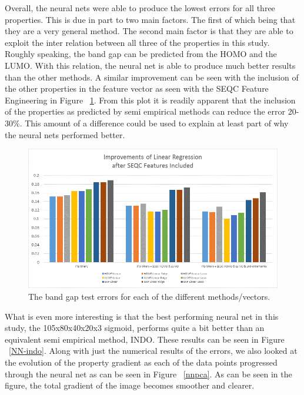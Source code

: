 \documentclass[10pt, oneside]{article}   	%
\begin{document}
Overall, the neural nets were able to produce the lowest errors for all three properties. This is due in part to two main factors. The first of which being that they are a very general method. The second main factor is that they are able to exploit the inter relation between all three of the properties in this study. Roughly speaking, the band gap can be predicted from the HOMO and the LUMO. With this relation, the neural net is able to produce much better results than the other methods. A similar improvement can be seen with the inclusion of the other properties in the feature vector as seen with the SEQC Feature Engineering in Figure ~\ref{seqc}. From this plot it is readily apparent that the inclusion of the properties as predicted by semi empirical methods can reduce the error 20-30\%. This amount of a difference could be used to explain at least part of why the neural nets performed better.

\begin{figure}[H]
\begin{center}
\includegraphics [width=.7\textwidth]{seqc_fig.png}
\caption{The band gap test errors for each of the different methods/vectors.}\label{seqc}
\end{center}
\end{figure}

What is even more interesting is that the best performing neural net in this study, the 105x80x40x20x3 sigmoid, performs quite a bit better than an equivalent semi empirical method, INDO. These results can be seen in Figure ~\ref{NN-indo}. Along with just the numerical results of the errors, we also looked at the evolution of the property gradient as each of the data points progressed through the neural net as can be seen in Figure ~\ref{nnpca}. As can be seen in the figure, the total gradient of the image becomes smoother and clearer.
\end{document}
